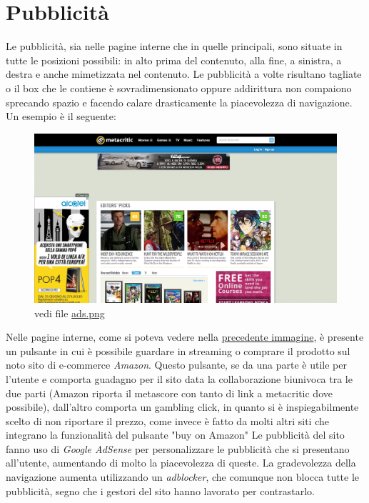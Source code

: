\documentclass[12pt]{article}
\begin{document}
\section{Pubblicità}
Le pubblicità, sia nelle pagine interne che in quelle principali, sono situate in tutte le posizioni possibili: in alto prima del contenuto, alla fine, a sinistra, a destra e anche mimetizzata nel contenuto. Le pubblicità a volte risultano tagliate o il box che le contiene è sovradimensionato oppure addirittura non compaiono sprecando spazio e facendo calare drasticamente la piacevolezza di navigazione. Un esempio è il seguente:
\begin{figure}[H]
	\begin{center}
		\includegraphics[width=13.5cm]{ads.png}
		\caption{vedi file \href{ads.png}{ads.png}}
	\end{center}
\end{figure}
Nelle pagine interne, come si poteva vedere nella \hyperlink{interna}{precedente immagine}, è presente un pulsante in cui è possibile guardare in streaming o comprare il prodotto sul noto sito di e-commerce \textit{Amazon}. Questo pulsante, se da una parte è utile per l'utente e comporta guadagno per il sito data la collaborazione biunivoca tra le due parti (Amazon riporta il metascore con tanto di link a metacritic dove possibile), dall'altro comporta un gambling click, in quanto si è inspiegabilmente scelto di non riportare il prezzo, come invece è fatto da molti altri siti che integrano la funzionalità del pulsante "buy on Amazon"
Le pubblicità del sito fanno uso di \textit{Google AdSense} per personalizzare le pubblicità che si presentano all'utente, aumentando di molto la piacevolezza di queste.
La gradevolezza della navigazione aumenta utilizzando un \textit{adblocker}, che comunque non blocca tutte le pubblicità, segno che i gestori del sito hanno lavorato per contrastarlo.
\newpage
\end{document}
